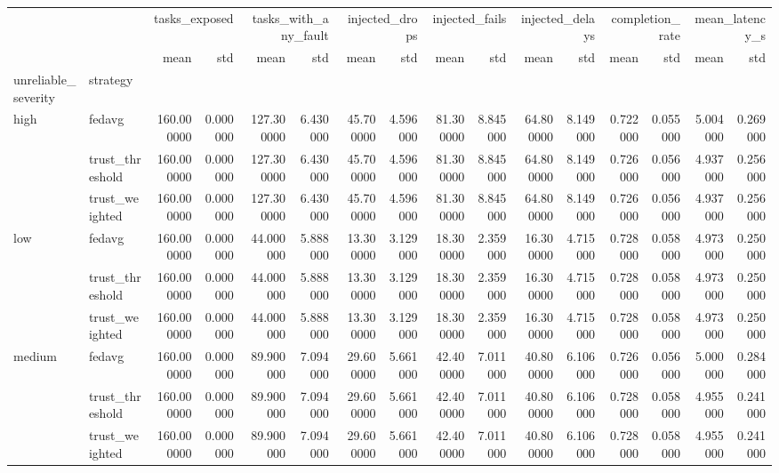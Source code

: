 \begin{tabular}{llrrrrrrrrrrrrrr}
\toprule
 &  & \multicolumn{2}{r}{tasks_exposed} & \multicolumn{2}{r}{tasks_with_any_fault} & \multicolumn{2}{r}{injected_drops} & \multicolumn{2}{r}{injected_fails} & \multicolumn{2}{r}{injected_delays} & \multicolumn{2}{r}{completion_rate} & \multicolumn{2}{r}{mean_latency_s} \\
 &  & mean & std & mean & std & mean & std & mean & std & mean & std & mean & std & mean & std \\
unreliable_severity & strategy &  &  &  &  &  &  &  &  &  &  &  &  &  &  \\
\midrule
\multirow[t]{3}{*}{high} & fedavg & 160.000000 & 0.000000 & 127.300000 & 6.430000 & 45.700000 & 4.596000 & 81.300000 & 8.845000 & 64.800000 & 8.149000 & 0.722000 & 0.055000 & 5.004000 & 0.269000 \\
 & trust_threshold & 160.000000 & 0.000000 & 127.300000 & 6.430000 & 45.700000 & 4.596000 & 81.300000 & 8.845000 & 64.800000 & 8.149000 & 0.726000 & 0.056000 & 4.937000 & 0.256000 \\
 & trust_weighted & 160.000000 & 0.000000 & 127.300000 & 6.430000 & 45.700000 & 4.596000 & 81.300000 & 8.845000 & 64.800000 & 8.149000 & 0.726000 & 0.056000 & 4.937000 & 0.256000 \\
\cline{1-16}
\multirow[t]{3}{*}{low} & fedavg & 160.000000 & 0.000000 & 44.000000 & 5.888000 & 13.300000 & 3.129000 & 18.300000 & 2.359000 & 16.300000 & 4.715000 & 0.728000 & 0.058000 & 4.973000 & 0.250000 \\
 & trust_threshold & 160.000000 & 0.000000 & 44.000000 & 5.888000 & 13.300000 & 3.129000 & 18.300000 & 2.359000 & 16.300000 & 4.715000 & 0.728000 & 0.058000 & 4.973000 & 0.250000 \\
 & trust_weighted & 160.000000 & 0.000000 & 44.000000 & 5.888000 & 13.300000 & 3.129000 & 18.300000 & 2.359000 & 16.300000 & 4.715000 & 0.728000 & 0.058000 & 4.973000 & 0.250000 \\
\cline{1-16}
\multirow[t]{3}{*}{medium} & fedavg & 160.000000 & 0.000000 & 89.900000 & 7.094000 & 29.600000 & 5.661000 & 42.400000 & 7.011000 & 40.800000 & 6.106000 & 0.726000 & 0.056000 & 5.000000 & 0.284000 \\
 & trust_threshold & 160.000000 & 0.000000 & 89.900000 & 7.094000 & 29.600000 & 5.661000 & 42.400000 & 7.011000 & 40.800000 & 6.106000 & 0.728000 & 0.058000 & 4.955000 & 0.241000 \\
 & trust_weighted & 160.000000 & 0.000000 & 89.900000 & 7.094000 & 29.600000 & 5.661000 & 42.400000 & 7.011000 & 40.800000 & 6.106000 & 0.728000 & 0.058000 & 4.955000 & 0.241000 \\
\cline{1-16}
\bottomrule
\end{tabular}
